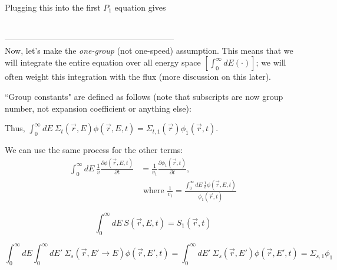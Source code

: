 \documentclass[12pt]{article}
\newif\ifeqns
\newcommand{\rvec}{\ensuremath{\vec{r}}}
\newcommand{\sigsi}{\ensuremath{\Sigma_{s,1}}}
\begin{document}
Plugging this into the first $P_1$ equation gives
\ifeqns
\begin{align*}
\frac{1}{v}\frac{\partial\phi(\rvec,E,t)}{\partial t} = &S(\rvec,E,t) + 
\int^{\infty}_0dE'\:\Sigma_s(\rvec,E'\rightarrow E)\phi(\rvec,E',t) - 
\Sigma_t(\rvec,E)\phi(\rvec,E,t) \\&+ \nabla\cdot[D(\rvec,E)\nabla\phi(\rvec,E,t)]\:.
\end{align*}
\else
\vspace*{5em}\\
\fi


--------------------------------------------------------------\\
Now, let's make the \emph{one-group} (not one-speed) assumption. This means that we will integrate the
entire equation over all energy space $[\int_0^{\infty}dE(\cdot)]$; we will often weight this integration with the flux (more discussion on this later).

``Group constants" are defined as follows (note that subscripts are now group number, not expansion coefficient or  anything else):

\ifeqns
\begin{align*}
\Sigma_{t,1}(\rvec)&=\frac{\int_0^{\infty}dE\:\Sigma_t(\rvec,E)\phi(\rvec,E,t)}{\int_0^{\infty}dE\phi(\rvec,E,t)}
= \text{effective group cross section}\\
%
\phi_1(\rvec,t) &= \int_0^{\infty}dE\:\phi(\rvec,E,t) = \text{group flux}
\end{align*}
\else
\vspace*{6em}
\fi

Thus, $\int_0^{\infty}dE\:\Sigma_t(\rvec,E)\phi(\rvec,E,t) = \Sigma_{t,1}(\rvec)\phi_1(\rvec,t)$.

We can use the same process for the other terms:
\ifeqns
\begin{align*}
\int_0^{\infty}dE\:\frac{1}{v}\frac{\partial\phi(\rvec,E,t)}{\partial t} &= 
\frac{1}{v_1}\frac{\partial \phi_1(\rvec,t)}{\partial t}, \\
%
&\text{ where } \frac{1}{v_1} = \frac{\int_0^{\infty}dE\:\frac{1}{v}\phi(\rvec,E,t)}{\phi_1(\rvec,t)}
\end{align*}

\begin{equation*}
\int_0^{\infty}dE\:S(\rvec,E,t) = S_1(\rvec,t)
\end{equation*}

\begin{equation*}
\int_0^{\infty}dE\int_0^{\infty}dE'\:\Sigma_s(\rvec,E'\rightarrow E)\phi(\rvec,E',t) =
\int_0^{\infty}dE'\:\Sigma_s(\rvec,E')\phi(\rvec,E',t) = \sigsi\phi_1
\end{equation*}
\end{document}
